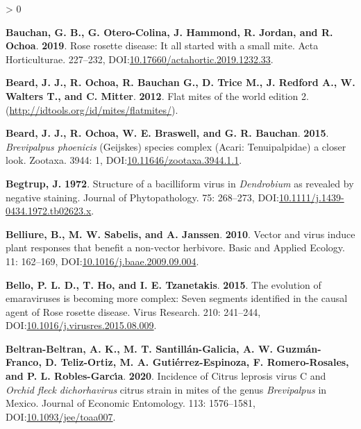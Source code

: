 \documentclass{ufdissertation}[overrideChapters] %
\newlength{\cslhangindent}
\newenvironment{CSLReferences}[2] %
 {%
  \setlength{\parindent}{0pt}
  \ifodd #1 \everypar{\setlength{\hangindent}{\cslhangindent}}\ignorespaces\fi
  \ifnum #2 > 0
  \setlength{\parskip}{#2\baselineskip}
  \fi
 }%
 {}
\begin{document}
{\begin{CSLReferences}{1}{1}
\leavevmode{}%
\textbf{Bauchan, G. B., G. Otero-Colina, J. Hammond, R. Jordan, and R. Ochoa}. \textbf{2019}. {Rose rosette disease}: It all started with a small mite. Acta Horticulturae. 227--232, DOI:\href{https://doi.org/10.17660/actahortic.2019.1232.33}{10.17660/actahortic.2019.1232.33}.

\leavevmode{}%
\textbf{Beard, J. J., R. Ochoa, R. Bauchan G., D. Trice M., J. Redford A., W. Walters T., and C. Mitter}. \textbf{2012}. Flat mites of the world edition 2. (\url{http://idtools.org/id/mites/flatmites/}).

\leavevmode{}%
\textbf{Beard, J. J., R. Ochoa, W. E. Braswell, and G. R. Bauchan}. \textbf{2015}. {\emph{Brevipalpus phoenicis}} {(Geijskes)} species complex ({Acari}: {Tenuipalpidae}) \textemdash a closer look. Zootaxa. 3944: 1, DOI:\href{https://doi.org/10.11646/zootaxa.3944.1.1}{10.11646/zootaxa.3944.1.1}.

\leavevmode{}%
\textbf{Begtrup, J.} \textbf{1972}. Structure of a bacilliform virus in {\emph{Dendrobium}} as revealed by negative staining. Journal of Phytopathology. 75: 268--273, DOI:\href{https://doi.org/10.1111/j.1439-0434.1972.tb02623.x}{10.1111/j.1439-0434.1972.tb02623.x}.

\leavevmode{}%
\textbf{Belliure, B., M. W. Sabelis, and A. Janssen}. \textbf{2010}. Vector and virus induce plant responses that benefit a non-vector herbivore. Basic and Applied Ecology. 11: 162--169, DOI:\href{https://doi.org/10.1016/j.baae.2009.09.004}{10.1016/j.baae.2009.09.004}.

\leavevmode{}%
\textbf{Bello, P. L. D., T. Ho, and I. E. Tzanetakis}. \textbf{2015}. The evolution of emaraviruses is becoming more complex: Seven segments identified in the causal agent of {Rose rosette disease}. Virus Research. 210: 241--244, DOI:\href{https://doi.org/10.1016/j.virusres.2015.08.009}{10.1016/j.virusres.2015.08.009}.

\leavevmode{}%
\textbf{Beltran-Beltran, A. K., M. T. Santillán-Galicia, A. W. Guzmán-Franco, D. Teliz-Ortiz, M. A. Gutiérrez-Espinoza, F. Romero-Rosales, and P. L. Robles-Garcı́a}. \textbf{2020}. Incidence of {Citrus leprosis virus} {C} and {\emph{Orchid fleck dichorhavirus}} citrus strain in mites of the genus {\emph{Brevipalpus}} in {Mexico}. Journal of Economic Entomology. 113: 1576--1581, DOI:\href{https://doi.org/10.1093/jee/toaa007}{10.1093/jee/toaa007}.


\end{CSLReferences}}
\end{document}

